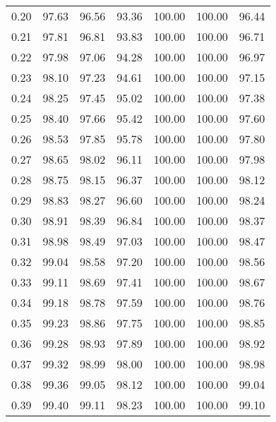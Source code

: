 \begin{tabular}{|c|c|c|c|c|c|c|}
      0.20 &     97.63 &     96.56 &      93.36 &  100.00 &     100.00 &         96.44 \\
      0.21 &     97.81 &     96.81 &      93.83 &  100.00 &     100.00 &         96.71 \\
      0.22 &     97.98 &     97.06 &      94.28 &  100.00 &     100.00 &         96.97 \\
      0.23 &     98.10 &     97.23 &      94.61 &  100.00 &     100.00 &         97.15 \\
      0.24 &     98.25 &     97.45 &      95.02 &  100.00 &     100.00 &         97.38 \\
      0.25 &     98.40 &     97.66 &      95.42 &  100.00 &     100.00 &         97.60 \\
      0.26 &     98.53 &     97.85 &      95.78 &  100.00 &     100.00 &         97.80 \\
      0.27 &     98.65 &     98.02 &      96.11 &  100.00 &     100.00 &         97.98 \\
      0.28 &     98.75 &     98.15 &      96.37 &  100.00 &     100.00 &         98.12 \\
      0.29 &     98.83 &     98.27 &      96.60 &  100.00 &     100.00 &         98.24 \\
      0.30 &     98.91 &     98.39 &      96.84 &  100.00 &     100.00 &         98.37 \\
      0.31 &     98.98 &     98.49 &      97.03 &  100.00 &     100.00 &         98.47 \\
      0.32 &     99.04 &     98.58 &      97.20 &  100.00 &     100.00 &         98.56 \\
      0.33 &     99.11 &     98.69 &      97.41 &  100.00 &     100.00 &         98.67 \\
      0.34 &     99.18 &     98.78 &      97.59 &  100.00 &     100.00 &         98.76 \\
      0.35 &     99.23 &     98.86 &      97.75 &  100.00 &     100.00 &         98.85 \\
      0.36 &     99.28 &     98.93 &      97.89 &  100.00 &     100.00 &         98.92 \\
      0.37 &     99.32 &     98.99 &      98.00 &  100.00 &     100.00 &         98.98 \\
      0.38 &     99.36 &     99.05 &      98.12 &  100.00 &     100.00 &         99.04 \\
      0.39 &     99.40 &     99.11 &      98.23 &  100.00 &     100.00 &         99.10 \\

\end{tabular}

